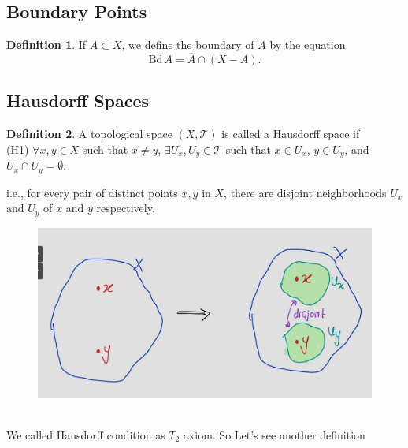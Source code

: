 \documentclass[
]{book}
\theoremstyle{definition}
\newtheorem{definition}{Definition}[chapter]
\theoremstyle{definition}
\theoremstyle{definition}
\theoremstyle{definition}
\theoremstyle{remark}
\begin{document}
\hypertarget{boundary-points}{%
\subsection{Boundary Points}\label{boundary-points}}

\begin{definition}
\protect\hypertarget{def:unnamed-chunk-75}{}\label{def:unnamed-chunk-75}If \(A \subset X\), we define the boundary of \(A\) by the equation
\[\text{Bd} \, A = \overline{A} \cap (X - A).\]
\end{definition}

\hypertarget{hausdorff-spaces}{%
\subsection{Hausdorff Spaces}\label{hausdorff-spaces}}

\begin{definition}
\protect\hypertarget{def:unnamed-chunk-76}{}\label{def:unnamed-chunk-76}A topological space \((X,\mathcal{T})\) is called a Hausdorff space if\\
(H1) \(\forall x,y \in X\) such that \(x \neq y\), \(\exists U_x, U_y \in \mathcal{T}\) such that \(x \in U_x\), \(y \in U_y\), and \(U_x \cap U_y = \emptyset\).

i.e., for every pair of distinct points \(x, y\) in \(X\), there are disjoint neighborhoods \(U_x\) and \(U_y\) of \(x\) and \(y\) respectively.
\end{definition}

\begin{figure}
\centering
\includegraphics{figures/figure 16.jpg}
\caption{\label{fig:fig16}\(~\)}
\end{figure}

We called Hausdorff condition as \(T_2\) axiom. So Let's see another definition
\end{document}
